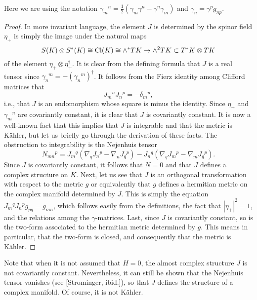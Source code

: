 Here we are using the notation
$\gamma_m{}^n=\frac{1}{2}\left(\gamma_m\gamma^n-\gamma^n\gamma_m\right)$ and
$\gamma_n=\gamma^pg_{np}$.

\begin{proof}
In more invariant language, the element $J$ is determined by the
spinor field $\eta_+$ is simply the image under the natural maps
$$S(K)\otimes S^*(K)\cong {\rm Cl}(K)\cong \wedge ^*TK\to \wedge^2TK
\subset T^*K\otimes TK$$
of the element $\eta_+\otimes \eta_+^\dagger$.
It is clear from the defining formula that $J$ is a real tensor since
$\gamma_n{}^m=-(\gamma_n{}^m)^\dagger$. 
It follows  from the Fierz identity among Clifford matrices that
$$J_m{}^nJ_n{}^p=-\delta_m{}^p,$$
i.e., that $J$ is an endomorphism whose
square is minus the identity. 
Since $\eta_+$ and $\gamma_m{}^n$ are covariantly constant, it is clear
that $J$ is covariantly constant.
It is now a well-known fact that this implies that $J$ is integrable
and that the metric is K\"ahler, but let us briefly go through the
derivation of these facts.
The obstruction to integrability is the Nejenhuis tensor
$$N_{mn}{}^p=J_m{}^q(\nabla_qJ_n{}^p-\nabla_nJ_q{}^p)
-J_n{}^q(\nabla_qJ_m{}^p -\nabla_mJ_q{}^p).$$
Since $J$ is covariantly constant, it follows that $N=0$ and that $J$
defines a complex structure on $K$. 
Next, let us see that $J$ is an orthogonal transformation with respect
to the metric $g$ or equivalently that $g$ defines a hermitian metric
on the complex manifold determined by $J$.
This is simply the equation $J_m{}^qJ_n{}^pg_{pq}=g_{mn}$, which follows
easily from the definitions, the fact that $|\eta_+|^2=1$, and the
relations among the $\gamma$-matrices.
Last, since $J$ is covariantly constant, so is the  two-form
associated to the hermitian metric determined by $g$.   This means in
particular, that the two-form is closed, and consequently that the
metric is K\"ahler. 
\end{proof}

Note that when it is not assumed that $H= 0$, the almost complex
structure $J$ is not 
covariantly constant.  Nevertheless, it can still be shown that the
Nejenhuis tensor vanishes (see [Strominger, ibid.]), so that $J$
defines the structure of a complex manifold. Of course, it is not
K\"ahler. 

